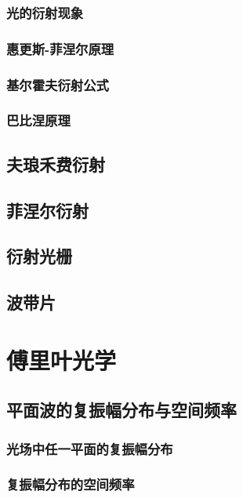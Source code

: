 \documentclass[cn,10pt,chinesefont=founder,math=mtpro2,cite=super,toc=onecol,twoside]{elegantbook}
\begin{document}
\subsection{光的衍射现象}

\subsection{惠更斯-菲涅尔原理}

\subsection{基尔霍夫衍射公式}

\subsection{巴比涅原理}

\section{夫琅禾费衍射}

\section{菲涅尔衍射}

\section{衍射光栅}

\section{波带片}

\chapter{傅里叶光学}

\section{平面波的复振幅分布与空间频率}

\subsection{光场中任一平面的复振幅分布}

\subsection{复振幅分布的空间频率}
\end{document}
